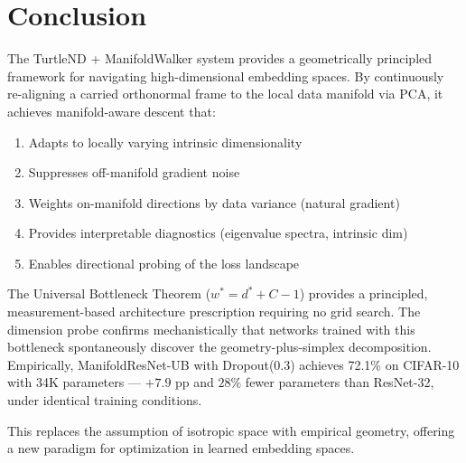 \documentclass[11pt,letterpaper]{article}
\begin{document}
\section{Conclusion}
\label{sec:conclusion}

The TurtleND + ManifoldWalker system provides a geometrically principled
framework for navigating high-dimensional embedding spaces. By continuously
re-aligning a carried orthonormal frame to the local data manifold via PCA,
it achieves manifold-aware descent that:
\begin{enumerate}[nosep]
  \item Adapts to locally varying intrinsic dimensionality
  \item Suppresses off-manifold gradient noise
  \item Weights on-manifold directions by data variance (natural gradient)
  \item Provides interpretable diagnostics (eigenvalue spectra, intrinsic dim)
  \item Enables directional probing of the loss landscape
\end{enumerate}

The Universal Bottleneck Theorem ($w^* = d^* + C - 1$) provides a principled,
measurement-based architecture prescription requiring no grid search.  The
dimension probe confirms mechanistically that networks trained with this
bottleneck spontaneously discover the geometry-plus-simplex decomposition.
Empirically, ManifoldResNet-UB with Dropout(0.3) achieves 72.1\% on CIFAR-10
with 34K parameters --- $+7.9$ pp and $28\%$ fewer parameters than ResNet-32,
under identical training conditions.

This replaces the assumption of isotropic space with empirical geometry,
offering a new paradigm for optimization in learned embedding spaces.
\end{document}
